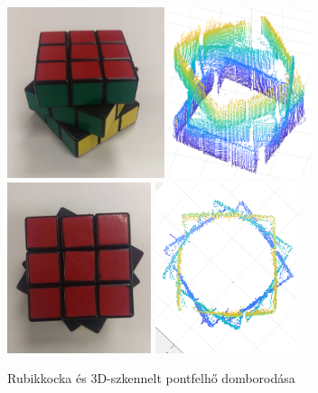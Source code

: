 \documentclass[12pt,a4paper]{article}
\begin{document}
\begin{figure}[h!]
	\begin{center}
		\includegraphics[height=5cm]{images/rubik1}
		\includegraphics[height=5cm]{images/rubik2}
		\\
		\includegraphics[height=5cm]{images/rubik3}
		\includegraphics[height=5cm]{images/rubik4}
	\end{center}
	\caption{Rubikkocka és 3D-szkennelt pontfelhő domborodása}
\end{figure}
\end{document}
